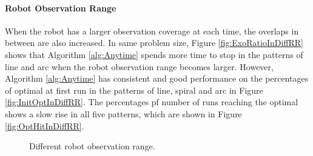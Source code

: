 \documentclass[12pt]{article}
\begin{document}
\paragraph{Robot Observation Range}

When the robot has a larger observation coverage at each time, the overlaps in between are also increased. 
In same problem size, Figure \ref{fig:ExoRatioInDiffRR} shows that Algorithm \ref{alg:Anytime} spends more time to stop in the patterns of line and arc when the robot observation range becomes larger.
However, Algorithm \ref{alg:Anytime} has consistent and good performance on the percentages of optimal at first run in the patterns of line, spiral and arc in Figure \ref{fig:InitOptInDiffRR}. 
The percentages pf number of runs reaching the optimal shows a slow rise in all five patterns, which are shown in Figure \ref{fig:OptHitInDiffRR}.

\begin{figure}[H]
  \centering 
  \caption{Different robot observation range.} 
  \label{fig:PMdiffRR} %
\end{figure}
\end{document}
